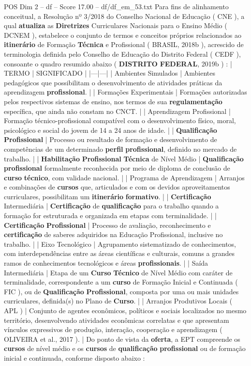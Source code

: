 \begin{textsample}{POS Dim 2 – df – Score 17.00 – df/df\_em\_53.txt}
Para fins de alinhamento conceitual, a Resolução nº 3/2018 do Conselho Nacional de Educação ( CNE ), a qual \textbf{atualiza} as \textbf{Diretrizes} Curriculares Nacionais para o Ensino Médio ( DCNEM ), estabelece o conjunto de termos e conceitos próprios relacionados ao \textbf{itinerário} de Formação \textbf{Técnica} e Profissional ( BRASIL, 2018b ), acrescido de terminologia definida pelo Conselho de Educação do Distrito Federal ( CEDF ), consoante o quadro resumido abaixo ( \textbf{DISTRITO} \textbf{FEDERAL}, 2019b ) : | TERMO | SIGNIFICADO | |---|---| | Ambientes Simulados | Ambientes pedagógicos que possibilitam o desenvolvimento de atividades práticas da aprendizagem \textbf{profissional}. | | Formações Experimentais | Formações autorizadas pelos respectivos sistemas de ensino, nos termos de sua \textbf{regulamentação} específica, que ainda não constam no CNCT. | | Aprendizagem Profissional | Formação técnico-profissional compatível com o desenvolvimento físico, moral, psicológico e social do jovem de 14 a 24 anos de idade. | | \textbf{Qualificação} \textbf{Profissional} | Processo ou resultado de formação e desenvolvimento de competências de um determinado \textbf{perfil} \textbf{profissional}, definido no mercado de trabalho. | | \textbf{Habilitação} \textbf{Profissional} \textbf{Técnica} de Nível Médio | \textbf{Qualificação} \textbf{profissional} formalmente reconhecida por meio de diploma de conclusão de \textbf{curso} \textbf{técnico}, com validade nacional. | | Programa de Aprendizagem | Arranjos e combinações de \textbf{cursos} que, articulados e com os devidos aproveitamentos curriculares, possibilitam um \textbf{itinerário} \textbf{formativo}. | | \textbf{Certificação} Intermediária | \textbf{Certificação} de \textbf{qualificação} para o trabalho quando a formação for estruturada e organizada em etapas com terminalidade. | | \textbf{Certificação} \textbf{Profissional} | Processo de avaliação, reconhecimento e \textbf{certificação} de saberes adquiridos na Educação Profissional, inclusive no trabalho. | | Eixo Tecnológico | Agrupamento sistematizado de conhecimentos, com interdependências entre as áreas científicas e culturais, comuns a grandes ramos de conhecimentos tecnológicos e áreas \textbf{profissionais}. | | Saída Intermediária | Etapa de um \textbf{Curso} \textbf{Técnico} de Nível Médio com caráter de terminalidade, correspondente a um \textbf{curso} de Formação Inicial e Continuada ( FIC ), ou de \textbf{Qualificação} \textbf{Profissional}, composta por uma ou mais unidades curriculares, definida(s) no Plano de \textbf{Curso}. | | Arranjos Produtivos Locais ( APL ) | Conjunto de agentes econômicos, políticos e sociais localizados no mesmo território, desenvolvendo atividades econômicas correlatas e que apresentam vínculos expressivos de produção, interação, cooperação e aprendizagem ( OLIVEIRA et al., 2017 ). | Do ponto de vista da \textbf{oferta}, a EPT compreende os \textbf{cursos} de nível médio e os \textbf{cursos} de \textbf{qualificação} \textbf{profissional} ou de formação inicial e continuada, conforme disposto abaixo :

\end{textsample}
